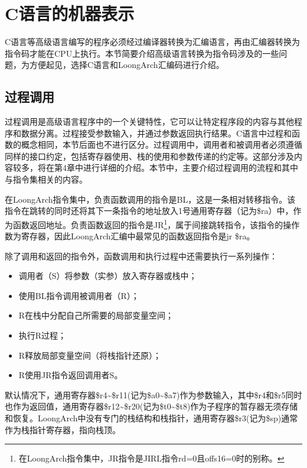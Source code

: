 \documentclass[]{ctexbook}
\providecommand{\tightlist}{%
  \setlength{\itemsep}{0pt}\setlength{\parskip}{0pt}}
\begin{document}
\hypertarget{cux8bedux8a00ux7684ux673aux5668ux8868ux793a}{%
\section{C语言的机器表示}\label{cux8bedux8a00ux7684ux673aux5668ux8868ux793a}}

C语言等高级语言编写的程序必须经过编译器转换为汇编语言，再由汇编器转换为指令码才能在CPU上执行。本节简要介绍高级语言转换为指令码涉及的一些问题，为方便起见，选择C语言和LoongArch汇编码进行介绍。

\hypertarget{ux8fc7ux7a0bux8c03ux7528}{%
\subsection{过程调用}\label{ux8fc7ux7a0bux8c03ux7528}}

过程调用是高级语言程序中的一个关键特性，它可以让特定程序段的内容与其他程序和数据分离。过程接受参数输入，并通过参数返回执行结果。C语言中过程和函数的概念相同，本节后面也不进行区分。过程调用中，调用者和被调用者必须遵循同样的接口约定，包括寄存器使用、栈的使用和参数传递的约定等。这部分涉及内容较多，将在第4章中进行详细的介绍。本节中，主要介绍过程调用的流程和其中与指令集相关的内容。

在LoongArch指令集中，负责函数调用的指令是BL，这是一条相对转移指令。该指令在跳转的同时还将其下一条指令的地址放入1号通用寄存器（记为\$ra）中，作为函数返回地址。负责函数返回的指令是JR\footnote{在LoongArch指令集中，JR指令是JIRL指令rd=0且offs16=0时的别称。}，属于间接跳转指令，该指令的操作数为寄存器，因此LoongArch汇编中最常见的函数返回指令是jr \$ra。

除了调用和返回的指令外，函数调用和执行过程中还需要执行一系列操作：

\begin{itemize}
\tightlist
\item
  调用者（S）将参数（实参）放入寄存器或栈中；
\item
  使用BL指令调用被调用者（R）；
\item
  R在栈中分配自己所需要的局部变量空间；
\item
  执行R过程；
\item
  R释放局部变量空间（将栈指针还原）；
\item
  R使用JR指令返回调用者S。
\end{itemize}

默认情况下，通用寄存器\$r4\textasciitilde\$r11(记为\$a0\textasciitilde\$a7)作为参数输入，其中\$r4和\$r5同时也作为返回值，通用寄存器\$r12\textasciitilde\$r20(记为\$t0\textasciitilde\$t8)作为子程序的暂存器无须存储和恢复。LoongArch中没有专门的栈结构和栈指针，通用寄存器\$r3(记为\$sp)通常作为栈指针寄存器，指向栈顶。
\end{document}
